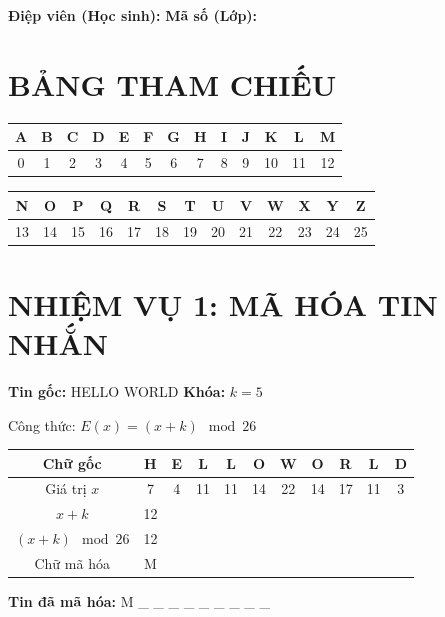 \documentclass[12pt,a4paper]{article}
\begin{document}
\begin{center}
    \vspace{0.5cm}
\end{center}

\noindent \textbf{Điệp viên (Học sinh):} \dotfill \textbf{Mã số (Lớp):} \dotfill

\section*{\color{cryptogreen} BẢNG THAM CHIẾU}
\begin{center}
\begin{tabular}{|c|c|c|c|c|c|c|c|c|c|c|c|c|}
\hline
A & B & C & D & E & F & G & H & I & J & K & L & M \\
\hline
0 & 1 & 2 & 3 & 4 & 5 & 6 & 7 & 8 & 9 & 10 & 11 & 12 \\
\hline
\end{tabular}
\vspace{0.3cm}

\begin{tabular}{|c|c|c|c|c|c|c|c|c|c|c|c|c|}
\hline
N & O & P & Q & R & S & T & U & V & W & X & Y & Z \\
\hline
13 & 14 & 15 & 16 & 17 & 18 & 19 & 20 & 21 & 22 & 23 & 24 & 25 \\
\hline
\end{tabular}
\end{center}

\section*{\color{cryptogreen} NHIỆM VỤ 1: MÃ HÓA TIN NHẮN}
\textbf{Tin gốc:} HELLO WORLD \quad \textbf{Khóa:} $k = 5$

Công thức: $E(x) = (x + k) \mod 26$

\begin{center}
\begin{tabular}{|c|c|c|c|c|c|c|c|c|c|c|}
\hline
Chữ gốc & H & E & L & L & O & W & O & R & L & D \\
\hline
Giá trị $x$ & 7 & 4 & 11 & 11 & 14 & 22 & 14 & 17 & 11 & 3 \\
\hline
$x + k$ & 12 & & & & & & & & & \\
\hline
$(x+k) \mod 26$ & 12 & & & & & & & & & \\
\hline
Chữ mã hóa & M & & & & & & & & & \\
\hline
\end{tabular}
\end{center}
\textbf{Tin đã mã hóa:} M \_ \_ \_ \_ \quad \_ \_ \_ \_ \_
\end{document}
